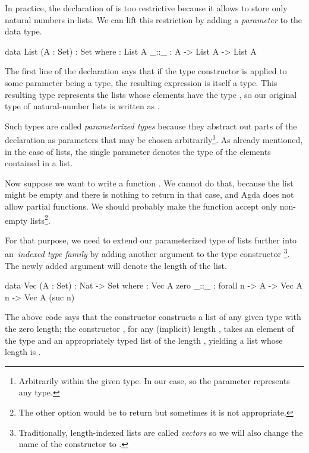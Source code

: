 In practice, the declaration of  is too restrictive because it allows to store
only natural numbers in lists. We can lift this restriction by adding a \emph{parameter} to
the data type.
\begin{code}
  data List (A : Set) : Set where
    \NIL : List A
    _::_ : A -> List A -> List A
\end{code}
The first line of the declaration says that if the type constructor  is applied
to some parameter  being a type, the resulting expression  is itself
a type. This resulting type represents the lists whose elements have the type ,
so our original type of natural-number lists is written as .

Such types are called \emph{parameterized types} because they abstract out parts of the
declaration as parameters that may be chosen arbitrarily\footnote{Arbitrarily within the given
type. In our case,  so the parameter  represents any type.}.
As already mentioned, in the case
of lists, the single parameter  denotes the type of the elements contained in a list.

Now suppose we want to write a function .
We cannot do that, because the list might be empty and there is nothing to return in that case,
and Agda does not allow partial functions. We should probably make the function accept only
non-empty lists\footnote{The other option would be to return  but sometimes
it is not appropriate.}.

For that purpose, we need to extend our parameterized type of lists further into
an~\emph{indexed type family} by adding another argument to the type constructor %
\footnote{Traditionally, length-indexed lists are called \emph{vectors} so we will also
change the name of the constructor to .}.
The newly added argument will denote the length of the list.
\begin{code}
  data Vec (A : Set) : Nat -> Set where
    \NIL : Vec A zero
    _::_ : forall {n} -> A -> Vec A n -> Vec A (suc n)
\end{code}
The above code says that the constructor \ident{[\,]} constructs a list of any given type
with the zero length; the constructor \ident{\_::\_}, for any (implicit) length ,
takes an element of the type  and an appropriately typed list of the length ,
yielding a list whose length is .

